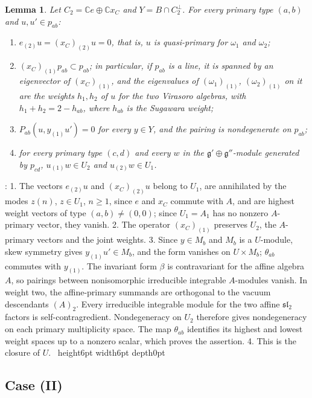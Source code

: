 \documentclass[leqno]{article}
\newcommand{\Cbb}{\ensuremath{\mathbb{C}}}
\renewcommand{\geq}{\ensuremath{\geqslant}}
\newcommand{\qed}{\hfill \vrule height6pt  width6pt depth0pt}
\newtheorem{lemma}[thm]{Lemma}
\newenvironment{proof}[1][]{\noindent {\it Proof #1} : }{\hbox{~}\qed
\smallskip
}
\numberwithin{equation}{section}
\begin{document}
\begin{lemma}
\label{lem:line-conditions}
Let $C_2 = \Cbb e \oplus \Cbb x_C$ and $Y = B \cap C_2^\perp$. For every primary type $(a,b)$ and $u,u' \in p_{ab}$:
\begin{enumerate}
\item $e_{(2)}u = (x_C)_{(2)}u = 0$, that is, $u$ is quasi-primary for $\omega_1$ and $\omega_2$;
\item $(x_C)_{(1)}p_{ab} \subset p_{ab}$; in particular, if $p_{ab}$ is a line, it is spanned by an eigenvector of $(x_C)_{(1)}$, and the eigenvalues of $(\omega_1)_{(1)}$, $(\omega_2)_{(1)}$ on it are the weights $h_1, h_2$ of $u$ for the two Virasoro algebras, with $h_1+h_2 = 2-h_{ab}$, where $h_{ab}$ is the Sugawara weight;
\item $P_{ab}(u,y_{(1)}u') = 0$ for every $y \in Y$, and the pairing is nondegenerate on $p_{ab}$;
\item for every primary type $(c,d)$ and every $w$ in the $\mathfrak g' \oplus \mathfrak g''$-module generated by $p_{cd}$, $u_{(1)}w \in U_2$ and $u_{(2)}w \in U_1$.
\end{enumerate}
\end{lemma}

\begin{proof}
1. The vectors $e_{(2)}u$ and $(x_C)_{(2)}u$ belong to $U_1$, are annihilated by the modes $z(n)$, $z \in U_1$, $n \geq 1$, since $e$ and $x_C$ commute with $A$, and are highest weight vectors of type $(a,b) \neq (0,0)$; since $U_1 = A_1$ has no nonzero $A$-primary vector, they vanish. 2. The operator $(x_C)_{(1)}$ preserves $U_2$, the $A$-primary vectors and the joint weights. 3. Since $y \in M_b$ and $M_b$ is a $U$-module, skew symmetry gives $y_{(1)}u' \in M_b$, and the form vanishes on $U \times M_b$; $\theta_{ab}$ commutes with $y_{(1)}$. The invariant form $\beta$ is contravariant for the affine algebra $A$, so pairings between nonisomorphic irreducible integrable $A$-modules vanish. In weight two, the affine-primary summands are orthogonal to the vacuum descendants $(A)_2$. Every irreducible integrable module for the two affine $\mathfrak{sl}_2$ factors is self-contragredient. Nondegeneracy on $U_2$ therefore gives nondegeneracy on each primary multiplicity space. The map $\theta_{ab}$ identifies its highest and lowest weight spaces up to a nonzero scalar, which proves the assertion. 4. This is the closure of $U$.
\end{proof}

\subsection{Case (II)}
\end{document}
